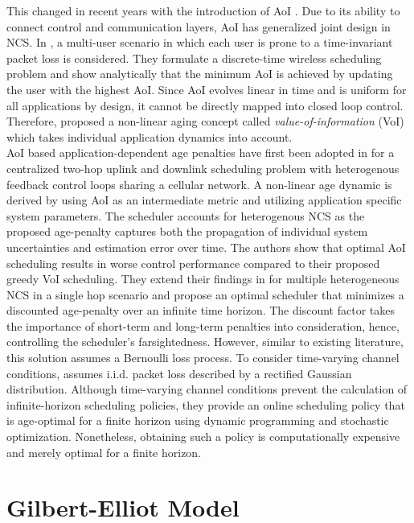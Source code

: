 This changed in recent years with the introduction of AoI \cite{kaul2012real}.
Due to its ability to connect control and communication layers, AoI has
generalized joint design in NCS. In \cite{kadota2018scheduling}, a multi-user
scenario in which each user is prone to a time-invariant packet loss is
considered. They formulate a discrete-time wireless scheduling problem and show
analytically that the minimum AoI is achieved by updating the user with the
highest AoI. Since AoI evolves linear in time and is uniform for all
applications by design, it cannot be directly mapped into closed loop control.
Therefore, \cite{kosta2017age} proposed a non-linear aging concept called
\textit{value-of-information} (VoI) which takes individual application dynamics
into account. \\
AoI based application-dependent age penalties have first been adopted in
\cite{ayan2019age} for a centralized two-hop uplink and downlink scheduling
problem with heterogenous feedback control loops sharing a cellular network. A
non-linear age dynamic is derived by using AoI as an intermediate metric and
utilizing application specific system parameters. The scheduler accounts for
heterogenous NCS as the proposed age-penalty captures both the propagation of
individual system uncertainties and estimation error over time. The authors show
that optimal AoI scheduling results in worse control performance compared to
their proposed greedy VoI scheduling. They extend their findings in
\cite{ayan2020optimal} for multiple heterogeneous NCS in a single hop scenario
and propose an optimal scheduler that minimizes a discounted age-penalty over an
infinite time horizon. The discount factor takes the importance of short-term
and long-term penalties into consideration, hence, controlling the scheduler's
farsightedness. However, similar to existing literature, this solution assumes a
Bernoulli loss process. To consider time-varying channel conditions,
\cite{ayan2020aoi} assumes i.i.d. packet loss described by a rectified Gaussian
distribution. Although time-varying channel conditions prevent the calculation
of infinite-horizon scheduling policies, they provide an online scheduling
policy that is age-optimal for a finite horizon using dynamic programming and
stochastic optimization. Nonetheless, obtaining such a policy is computationally
expensive and merely optimal for a finite horizon.

\section{Gilbert-Elliot Model} \label{sec:GE}


